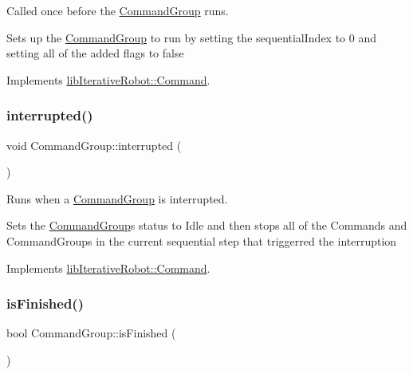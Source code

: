 Called once before the \mbox{\hyperlink{classlib_iterative_robot_1_1_command_group}{Command\+Group}} runs. 

Sets up the \mbox{\hyperlink{classlib_iterative_robot_1_1_command_group}{Command\+Group}} to run by setting the sequential\+Index to 0 and setting all of the added flags to false 

Implements \mbox{\hyperlink{classlib_iterative_robot_1_1_command_a14543c9d38b07e52f9ffb2af88a63f60}{lib\+Iterative\+Robot\+::\+Command}}.

\mbox{\label{classlib_iterative_robot_1_1_command_group_a5174a8e63675bead12b84e39df0ae90e}} 
\subsubsection{\texorpdfstring{interrupted()}{interrupted()}}
{\footnotesize\ttfamily void Command\+Group\+::interrupted (\begin{DoxyParamCaption}{ }\end{DoxyParamCaption})\hspace{0.3cm}{\ttfamily [virtual]}}



Runs when a \mbox{\hyperlink{classlib_iterative_robot_1_1_command_group}{Command\+Group}} is interrupted. 

Sets the \mbox{\hyperlink{classlib_iterative_robot_1_1_command_group}{Command\+Group}}\textquotesingle{}s status to Idle and then stops all of the Commands and Command\+Groups in the current sequential step that triggerred the interruption 

Implements \mbox{\hyperlink{classlib_iterative_robot_1_1_command_a1c17b601d1b69822cabadb92069d1747}{lib\+Iterative\+Robot\+::\+Command}}.

\mbox{\label{classlib_iterative_robot_1_1_command_group_a96807a2763adf9e21ebf2cb9e3574e3c}} 
\subsubsection{\texorpdfstring{isFinished()}{isFinished()}}
{\footnotesize\ttfamily bool Command\+Group\+::is\+Finished (\begin{DoxyParamCaption}{ }\end{DoxyParamCaption})\hspace{0.3cm}{\ttfamily [virtual]}}




